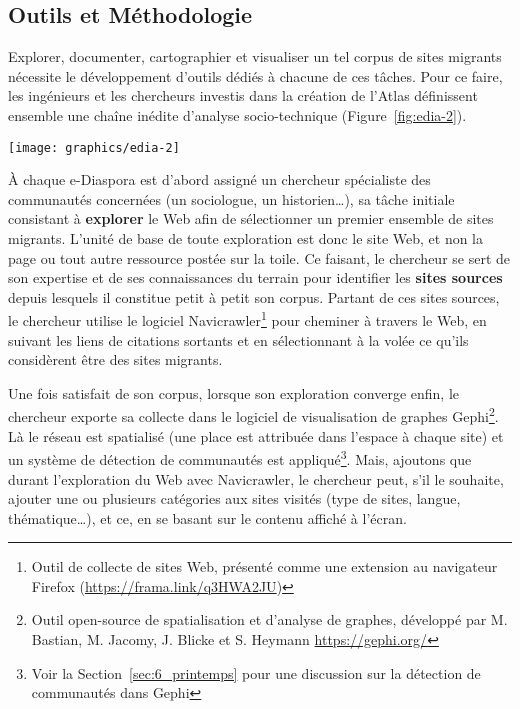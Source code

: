 \documentclass[symmetric,justified,marginals=raggedouter]{tufte-book}
\begin{document}
\subsection{Outils et Méthodologie}

\noindent Explorer, documenter, cartographier et visualiser un tel corpus de sites migrants nécessite le développement d'outils dédiés à chacune de ces tâches. Pour ce faire, les ingénieurs et les chercheurs investis dans la création de l'Atlas définissent ensemble une chaîne inédite d'analyse socio-technique (Figure~\ref{fig:edia-2}).

\begin{figure*}
  \texttt{[image: graphics/edia-2]}
  \caption{Chaîne d'analyse socio-technique de l'Atlas e-Diasporas (source~: M. Jacomy)}
  \label{fig:edia-2}
\end{figure*} 

\noindent À chaque e-Diaspora est d'abord assigné un chercheur spécialiste des communautés concernées (un sociologue, un historien\ldots{}), sa tâche initiale consistant à \textbf{explorer} le Web afin de sélectionner un premier ensemble de sites migrants. L'unité de base de toute exploration est donc le site Web, et non la page ou tout autre ressource postée sur la toile. Ce faisant, le chercheur se sert de son expertise et de ses connaissances du terrain pour identifier les \textbf{sites sources} depuis lesquels il constitue petit à petit son corpus. Partant de ces sites sources, le chercheur utilise le logiciel Navicrawler\footnote{\RaggedOuter Outil de collecte de sites Web, présenté comme une extension au navigateur Firefox (\url{https://frama.link/q3HWA2JU})} pour cheminer à travers le Web, en suivant les liens de citations sortants et en sélectionnant à la volée ce qu'ils considèrent être des sites migrants.  

Une fois satisfait de son corpus, lorsque son exploration converge enfin, le chercheur exporte sa collecte dans le logiciel de visualisation de graphes Gephi\footnote{\RaggedOuter Outil open-source de spatialisation et d'analyse de graphes, développé par M. Bastian, M. Jacomy, J. Blicke et S. Heymann \url{https://gephi.org/}}. Là le réseau est spatialisé (une place est attribuée dans l'espace à chaque site) et un système de détection de communautés est appliqué\footnote{\RaggedOuter Voir la Section~\ref{sec:6_printemps} pour une discussion sur la détection de communautés dans Gephi}. Mais, ajoutons que durant l'exploration du Web avec Navicrawler, le chercheur peut, s'il le souhaite, ajouter une ou plusieurs catégories aux sites visités (type de sites, langue, thématique\ldots{}), et ce, en se basant sur le contenu affiché à l'écran. 
\end{document}
